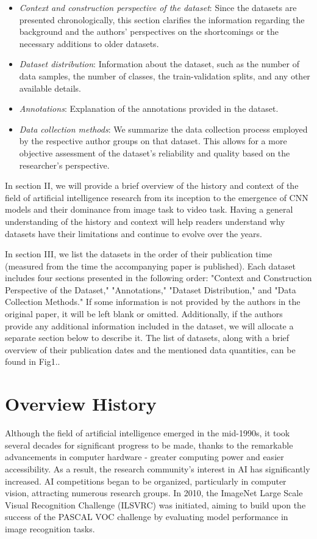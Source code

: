\documentclass[a4paper]{article}
\begin{document}
\begin{itemize}
	\item \textit{Context and construction perspective of the dataset}: Since the
	datasets are presented chronologically, this section clarifies the information
	regarding the background and the authors' perspectives on the shortcomings or
	the necessary additions to older datasets.
	\item \textit{Dataset distribution}: Information about the dataset, such as the
	number of data samples, the number of classes, the train-validation splits, and
	any other available details.
	\item \textit{Annotations}: Explanation of the annotations provided in the
	dataset.
	\item \textit{Data collection methods}: We summarize the data collection
	process employed by the respective author groups on that dataset. This allows
	for a more objective assessment of the dataset's reliability and quality based
	on the researcher's perspective.
\end{itemize}

In section II, we will provide a brief overview of the history and context of
the field of artificial intelligence research from its inception to the
emergence of CNN models and their dominance from image task to video task.
Having a general understanding of the history and context will help readers
understand why datasets have their limitations and continue to evolve over the
years.

In section III, we list the datasets in the order of their publication time
(measured from the time the accompanying paper is published). Each dataset
includes four sections presented in the following order: "Context
and Construction Perspective of the Dataset," "Annotations," "Dataset
Distribution," and "Data Collection Methods." If some information is not
provided by the authors in the original paper, it will be left blank or omitted.
Additionally, if the authors provide any additional information included in the
dataset, we will allocate a separate section below to describe it. The list of
datasets, along with a brief overview of their publication dates and the
mentioned data quantities, can be found in Fig1..
\section{Overview History}
Although the field of artificial intelligence emerged in the mid-1990s, it took
several decades for significant progress to be made, thanks to the remarkable
advancements in computer hardware - greater computing power and easier
accessibility. As a result, the research community's interest in AI has
significantly increased. AI competitions began to be organized, particularly in
computer vision, attracting numerous research groups. In 2010, the ImageNet
Large Scale Visual Recognition Challenge (ILSVRC) \cite{ILSVRC} was initiated,
aiming to build upon the success of the PASCAL VOC challenge \cite{PASCALVOC} by
evaluating model performance in image recognition tasks.
\end{document}
